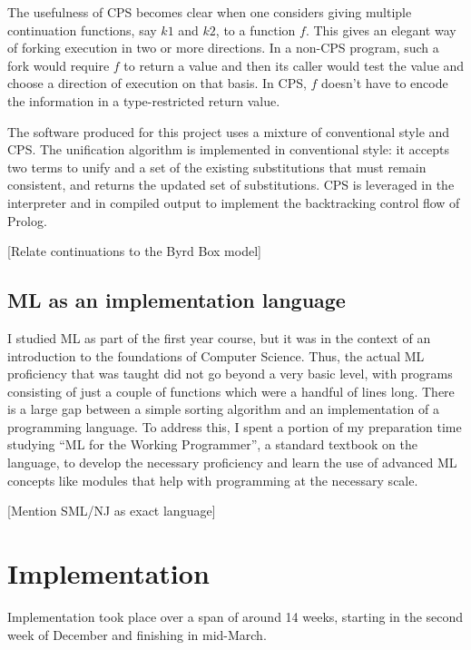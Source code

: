 \documentclass[12pt]{article}
\begin{document}
The usefulness of CPS becomes clear when one considers giving multiple continuation functions, say $k1$ and $k2$, to a function $f$. 
This gives an elegant way of forking execution in two or more directions. 
In a non-CPS program, such a fork would require $f$ to return a value and then its caller would test the value and choose a direction of execution on that basis. 
In CPS, $f$ doesn't have to encode the information in a type-restricted return value.

The software produced for this project uses a mixture of conventional style and CPS. 
The unification algorithm is implemented in conventional style: it accepts two terms to unify and a set of the existing substitutions that must remain consistent, and returns the updated set of substitutions. 
CPS is leveraged in the interpreter and in compiled output to implement the backtracking control flow of Prolog.

[Relate continuations to the Byrd Box model]


\subsection{ML as an implementation language}

I studied ML as part of the first year course, but it was in the context of an introduction to the foundations of Computer Science. 
Thus, the actual ML proficiency that was taught did not go beyond a very basic level, with programs consisting of just a couple of functions which were a handful of lines long. 
There is a large gap between a simple sorting algorithm and an implementation of a programming language. 
To address this, I spent a portion of my preparation time studying ``ML for the Working Programmer'', a standard textbook on the language, to develop the necessary proficiency and learn the use of advanced ML concepts like modules that help with programming at the necessary scale.

[Mention SML/NJ as exact language]

\newpage

\section{Implementation}



Implementation took place over a span of around 14 weeks, starting in the second week of December and finishing in mid-March. 
\end{document}
